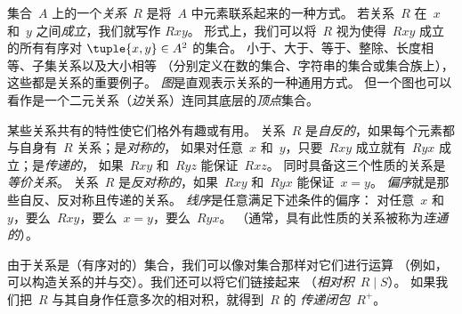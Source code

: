 集合~$A$ 上的一个\emph{关系}~$R$ 是将~$A$ 中元素联系起来的一种方式。
若关系~$R$ 在~$x$ 和~$y$ 之间\emph{成立}，我们就写作 $Rxy$。
形式上，我们可以将~$R$ 视为使得~$Rxy$ 成立的所有有序对
$\tuple{x,y} \in A^2$ 的集合。
小于、大于、等于、整除、长度相等、子集关系以及大小相等
（分别定义在数的集合、字符串的集合或集合族上），这些都是关系的重要例子。
\emph{图}是直观表示关系的一种通用方式。
但一个图也可以看作是一个二元关系（\emph{边}关系）连同其底层的\emph{顶点}集合。

某些关系共有的特性使它们格外有趣或有用。
关系~$R$ 是\emph{自反的}，如果每个元素都与自身有~$R$ 关系；是\emph{对称的}，
如果对任意~$x$ 和~$y$，只要~$Rxy$ 成立就有~$Ryx$ 成立；是\emph{传递的}，
如果~$Rxy$ 和~$Ryz$ 能保证~$Rxz$。
同时具备这三个性质的关系是\emph{等价关系}。
关系~$R$ 是\emph{反对称的}，如果~$Rxy$ 和~$Ryx$ 能保证~$x=y$。
\emph{偏序}就是那些自反、反对称且传递的关系。
\emph{线序}是任意满足下述条件的偏序：
对任意~$x$ 和~$y$，要么~$Rxy$，要么~$x=y$，要么~$Ryx$。
（通常，具有此性质的关系被称为\emph{连通的}）。

由于关系是（有序对的）集合，我们可以像对集合那样对它们进行运算
（例如，可以构造关系的并与交）。我们还可以将它们链接起来
（\emph{相对积}~$R \mid S$）。
如果我们把~$R$ 与其自身作任意多次的相对积，就得到~$R$ 的
\emph{传递闭包}~$R^+$。